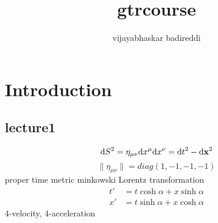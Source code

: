 \documentclass[12pt] {article}
\title{gtrcourse}
\author{vijayabhaskar badireddi}
\begin{document}
        
\section*{Introduction}
\subsection*{lecture1}
\[\dd S^2=\eta_{\mu\nu}\dd x^{\mu}\dd x^{\nu}=\dd t^2-\dd \vb{x}^2\]
\[\|\eta_{\mu\nu}\|=diag(1,-1,-1,-1)\]
proper time metric minkowski
Lorentz transformation
\begin{align*}
t'&=t\cosh\alpha+x\sinh\alpha\\
x'&=t\sinh\alpha+x\cosh\alpha
\end{align*}
4-velocity, 4-acceleration
\end{document}
